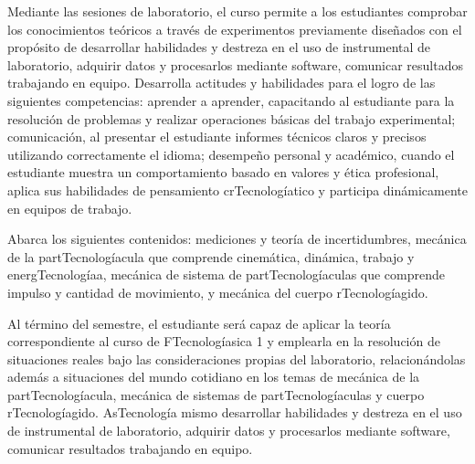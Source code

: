 \begin{syllabus}


\begin{justification}
Mediante las sesiones de laboratorio, el curso permite a los estudiantes comprobar los conocimientos teóricos a través de experimentos previamente diseñados con el propósito de desarrollar habilidades y destreza en el uso de instrumental de laboratorio, adquirir datos y procesarlos mediante software, comunicar resultados trabajando en equipo. Desarrolla actitudes y habilidades para el logro de las siguientes competencias: aprender a aprender, capacitando al estudiante para la resolución de problemas y realizar operaciones básicas del trabajo experimental; comunicación, al presentar el estudiante informes técnicos claros y precisos utilizando correctamente el idioma; desempeño personal y académico, cuando el estudiante muestra un comportamiento basado en valores y ética profesional, aplica sus habilidades de pensamiento crTecnologíatico y participa dinámicamente en equipos de trabajo.

Abarca los siguientes contenidos: mediciones y teoría de incertidumbres, mecánica de la partTecnologíacula que comprende cinemática, dinámica, trabajo y energTecnologíaa, mecánica de sistema de partTecnologíaculas que comprende impulso y cantidad de movimiento, y mecánica del cuerpo rTecnologíagido.
\end{justification}

\begin{goals}
\item Al término del semestre, el estudiante será capaz de aplicar la teoría correspondiente al curso de FTecnologíasica 1 y emplearla en la resolución de situaciones reales bajo las consideraciones propias del laboratorio, relacionándolas además a situaciones del mundo cotidiano en los temas de mecánica de la partTecnologíacula, mecánica de sistemas de partTecnologíaculas y cuerpo rTecnologíagido. AsTecnología mismo desarrollar habilidades y destreza en el uso de instrumental de laboratorio, adquirir datos y procesarlos mediante software, comunicar resultados trabajando en equipo.
\end{goals}

\begin{outcomes}
\item {}
\item {}
\end{outcomes}


\end{syllabus}
